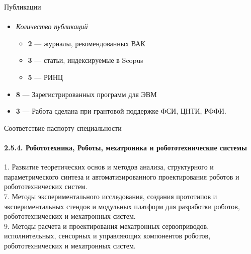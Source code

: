 \begin{frame}[t]{Публикации}
    \framesubtitle{}
    \begin{itemize}
        \item \textit{Количество публикаций}
              \begin{itemize}
                  \item \textbf{2} --- журналы, рекомендованных ВАК
                  \item \textbf{3} --- статьи, индексируемые в Scopus
                  \item \textbf{5} --- РИНЦ
              \end{itemize}
        \item \textbf{8} --- Зарегистрированных программ для ЭВМ
        \item \textbf{3} --- Работа сделана при грантовой поддержке ФСИ, ЦНТИ, РФФИ.
    \end{itemize}
\end{frame}


\begin{frame}[t]{Соответствие паспорту специальности}
    \framesubtitle{2.5.4. Робототехника, Роботы, мехатроника и
    робототехнические системы}
    1. Развитие теоретических основ и методов анализа, структурного и параметрического синтеза и автоматизированного проектирования роботов и робототехнических систем. \\
    7. Методы экспериментального исследования, создания прототипов и
    экспериментальных стендов и модульных платформ для разработки роботов, робототехнических и мехатронных систем. \\
    9. Методы расчета и проектирования мехатронных сервоприводов,
    исполнительных, сенсорных и управляющих компонентов роботов,
    робототехнических и мехатронных систем.
\end{frame}

